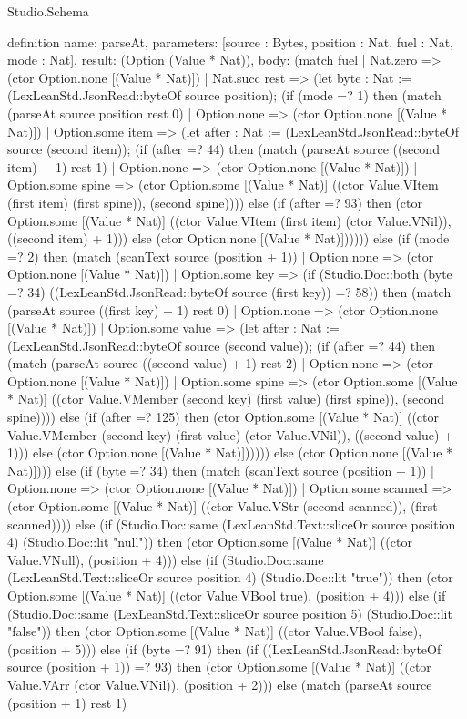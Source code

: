 \begin{lexlean}{Studio.Schema}
\begin{semanticmodule}
definition{
  name: parseAt,
  parameters: [source : Bytes, position : Nat, fuel : Nat, mode : Nat],
  result: (Option (Value * Nat)),
  body: (match fuel
    | Nat.zero => (ctor Option.none [(Value * Nat)])
    | Nat.succ rest => (let byte : Nat := (LexLeanStd.JsonRead::byteOf source position); (if (mode =? 1) then (match (parseAt source position rest 0)
      | Option.none => (ctor Option.none [(Value * Nat)])
      | Option.some item => (let after : Nat := (LexLeanStd.JsonRead::byteOf source (second item)); (if (after =? 44) then (match (parseAt source ((second item) + 1) rest 1)
        | Option.none => (ctor Option.none [(Value * Nat)])
        | Option.some spine => (ctor Option.some [(Value * Nat)] ((ctor Value.VItem (first item) (first spine)), (second spine)))) else (if (after =? 93) then (ctor Option.some [(Value * Nat)] ((ctor Value.VItem (first item) (ctor Value.VNil)), ((second item) + 1))) else (ctor Option.none [(Value * Nat)]))))) else (if (mode =? 2) then (match (scanText source (position + 1))
      | Option.none => (ctor Option.none [(Value * Nat)])
      | Option.some key => (if (Studio.Doc::both (byte =? 34) ((LexLeanStd.JsonRead::byteOf source (first key)) =? 58)) then (match (parseAt source ((first key) + 1) rest 0)
        | Option.none => (ctor Option.none [(Value * Nat)])
        | Option.some value => (let after : Nat := (LexLeanStd.JsonRead::byteOf source (second value)); (if (after =? 44) then (match (parseAt source ((second value) + 1) rest 2)
          | Option.none => (ctor Option.none [(Value * Nat)])
          | Option.some spine => (ctor Option.some [(Value * Nat)] ((ctor Value.VMember (second key) (first value) (first spine)), (second spine)))) else (if (after =? 125) then (ctor Option.some [(Value * Nat)] ((ctor Value.VMember (second key) (first value) (ctor Value.VNil)), ((second value) + 1))) else (ctor Option.none [(Value * Nat)]))))) else (ctor Option.none [(Value * Nat)]))) else (if (byte =? 34) then (match (scanText source (position + 1))
      | Option.none => (ctor Option.none [(Value * Nat)])
      | Option.some scanned => (ctor Option.some [(Value * Nat)] ((ctor Value.VStr (second scanned)), (first scanned)))) else (if (Studio.Doc::same (LexLeanStd.Text::sliceOr source position 4) (Studio.Doc::lit "null")) then (ctor Option.some [(Value * Nat)] ((ctor Value.VNull), (position + 4))) else (if (Studio.Doc::same (LexLeanStd.Text::sliceOr source position 4) (Studio.Doc::lit "true")) then (ctor Option.some [(Value * Nat)] ((ctor Value.VBool true), (position + 4))) else (if (Studio.Doc::same (LexLeanStd.Text::sliceOr source position 5) (Studio.Doc::lit "false")) then (ctor Option.some [(Value * Nat)] ((ctor Value.VBool false), (position + 5))) else (if (byte =? 91) then (if ((LexLeanStd.JsonRead::byteOf source (position + 1)) =? 93) then (ctor Option.some [(Value * Nat)] ((ctor Value.VArr (ctor Value.VNil)), (position + 2))) else (match (parseAt source (position + 1) rest 1)
}
\end{semanticmodule}
\end{lexlean}
